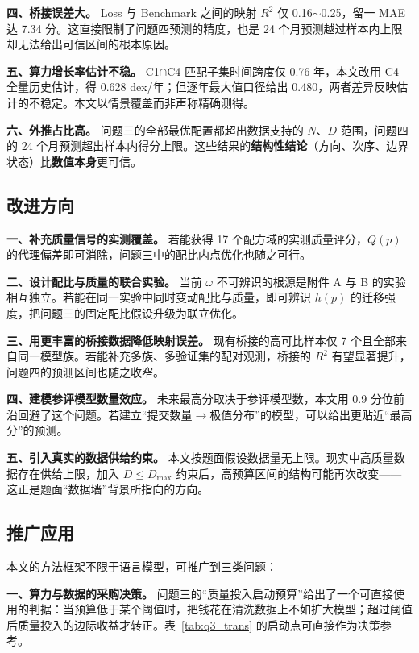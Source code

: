 \textbf{四、桥接误差大。} Loss 与 Benchmark 之间的映射 $R^2$ 仅 0.16$\sim$0.25，留一 MAE 达 7.34 分。这直接限制了问题四预测的精度，也是 24 个月预测越过样本内上限却无法给出可信区间的根本原因。

\textbf{五、算力增长率估计不稳。} C1$\cap$C4 匹配子集时间跨度仅 0.76 年，本文改用 C4 全量历史估计，得 0.628 dex/年；但逐年最大值口径给出 0.480，两者差异反映估计的不稳定。本文以情景覆盖而非声称精确测得。

\textbf{六、外推占比高。} 问题三的全部最优配置都超出数据支持的 $N$、$D$ 范围，问题四的 24 个月预测超出样本内得分上限。这些结果的\textbf{结构性结论}（方向、次序、边界状态）比\textbf{数值本身}更可信。

\subsection{改进方向}

\textbf{一、补充质量信号的实测覆盖。} 若能获得 17 个配方域的实测质量评分，$Q(p)$ 的代理偏差即可消除，问题三中的配比内点优化也随之可行。

\textbf{二、设计配比与质量的联合实验。} 当前 $\omega$ 不可辨识的根源是附件 A 与 B 的实验相互独立。若能在同一实验中同时变动配比与质量，即可辨识 $h(p)$ 的迁移强度，把问题三的固定配比假设升级为联立优化。

\textbf{三、用更丰富的桥接数据降低映射误差。} 现有桥接的高可比样本仅 7 个且全部来自同一模型族。若能补充多族、多验证集的配对观测，桥接的 $R^2$ 有望显著提升，问题四的预测区间也随之收窄。

\textbf{四、建模参评模型数量效应。} 未来最高分取决于参评模型数，本文用 0.9 分位前沿回避了这个问题。若建立``提交数量$\to$极值分布''的模型，可以给出更贴近``最高分''的预测。

\textbf{五、引入真实的数据供给约束。} 本文按题面假设数据量无上限。现实中高质量数据存在供给上限，加入 $D\le D_{\max}$ 约束后，高预算区间的结构可能再次改变——这正是题面``数据墙''背景所指向的方向。

\subsection{推广应用}

本文的方法框架不限于语言模型，可推广到三类问题：

\textbf{一、算力与数据的采购决策。} 问题三的``质量投入启动预算''给出了一个可直接使用的判据：当预算低于某个阈值时，把钱花在清洗数据上不如扩大模型；超过阈值后质量投入的边际收益才转正。表~\ref{tab:q3_trans} 的启动点可直接作为决策参考。

